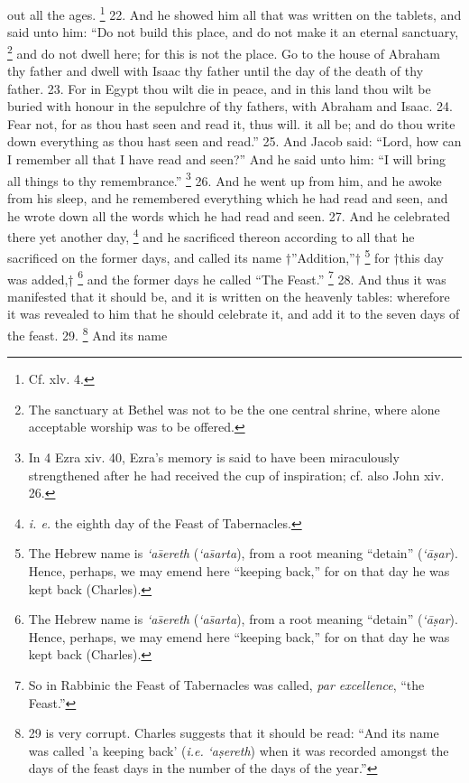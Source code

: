 out all the ages. \footnote{Cf. xlv. 4.} 22. And he showed him all that was written on the tablets, and said unto him: ``Do not build this place, and do not make it an eternal sanctuary, \footnote{The sanctuary at Bethel was not to be the one central shrine, where alone acceptable worship was to be offered.} and do not dwell here; for this is not the place. Go to the house of Abraham thy father and dwell with Isaac thy father until the day of the death of thy father. 23. For in Egypt thou wilt die in peace, and in this land thou wilt be buried with honour in the sepulchre of thy fathers, with Abraham and Isaac. 24. Fear not, for as thou hast seen and read it, thus will. it all be; and do thou write down everything as thou hast seen and read.'' 25. And Jacob said: ``Lord, how can I remember all that I have read and seen?'' And he said unto him: ``I will bring all things to thy remembrance.'' \footnote{In 4 Ezra xiv. 40, Ezra's memory is said to have been miraculously strengthened after he had received the cup of inspiration; cf. also John xiv. 26.} 26. And he went up from him, and he awoke from his sleep, and he remembered everything which he had read and seen, and he wrote down all the words which he had read and seen. 27. And he celebrated there yet another day, \footnote{\emph{i. e.} the eighth day of the Feast of Tabernacles.} and he sacrificed thereon according to all that he sacrificed on the former days, and called its name †''Addition,''† \footnote{The Hebrew name is \emph{‘a\={s}ereth} (\emph{‘a\={s}arta}), from a root meaning ``detain'' (\emph{‘ā\d{s}ar}). Hence, perhaps, we may emend here ``keeping back,'' for on that day he was kept back (Charles).} for †this day was added,† \footnote{The Hebrew name is \emph{‘a\={s}ereth} (\emph{‘a\={s}arta}), from a root meaning ``detain'' (\emph{‘ā\d{s}ar}). Hence, perhaps, we may emend here ``keeping back,'' for on that day he was kept back (Charles).} and the former days he called ``The Feast.'' \footnote{So in Rabbinic the Feast of Tabernacles was called, \emph{par excellence}, ``the Feast.''} 28. And thus it was manifested that it should be, and it is written on the heavenly tables: wherefore it was revealed to him that he should celebrate it, and add it to the seven days of the feast. 29. \footnote{29 is very corrupt. Charles suggests that it should be read: ``And its name was called 'a keeping back' (\emph{i.e.} \emph{‘a\d{s}ereth}) when it was recorded amongst the days of the feast days in the number of the days of the year.''} And its name

